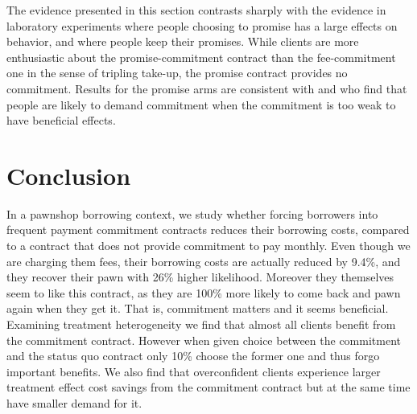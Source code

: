 \documentclass[oneside,11pt]{article}
\begin{document}
\vspace{.2in}
\noindent The evidence presented in this section contrasts sharply with the evidence in laboratory experiments where people choosing to promise has a large effects on behavior, and where people keep their promises. While clients are more enthusiastic about the promise-commitment contract than the fee-commitment one in the sense of tripling take-up, the promise contract provides no commitment. Results for the promise arms are consistent with \cite{Ted} and \cite{John} who find that people are likely to demand commitment when the commitment is too weak to have beneficial effects.
   
   


    
\section{Conclusion} \label{conclusion}

In a pawnshop borrowing context, we study whether forcing borrowers into frequent payment commitment contracts reduces their borrowing costs, compared to a contract that does not provide commitment to pay monthly. Even though we are charging them fees, their borrowing costs are actually reduced by 9.4\%, and they recover their pawn with 26\% higher likelihood. Moreover they themselves seem to like this contract, as they are 100\% more likely to come back and pawn again when they get it. That is, commitment matters and it seems beneficial. Examining treatment heterogeneity we find that almost all clients benefit from the commitment contract. However when given choice between the commitment and the status quo contract only 10\% choose the former one and thus forgo important benefits. We also find that overconfident clients experience larger treatment effect cost savings from the commitment contract but at the same time have smaller demand for it. 
\end{document}
